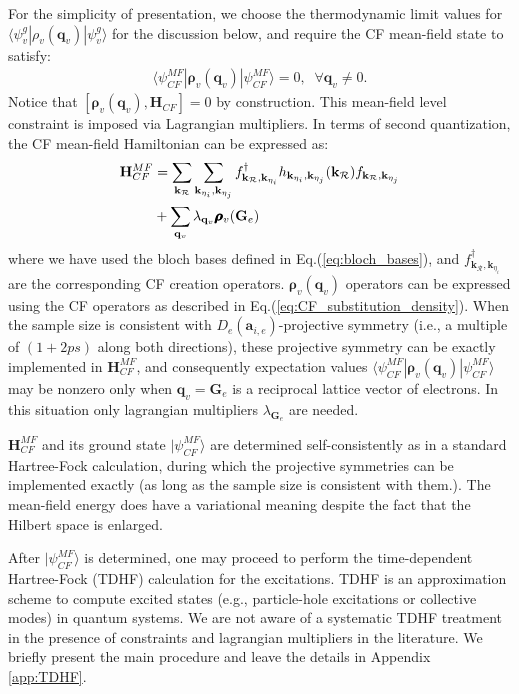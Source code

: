 For the simplicity of presentation, we choose the thermodynamic limit values for $\langle\psi^g_v|\rho_v(\mathbf q_v)|\psi^g_v\rangle$ for the discussion below, and require the CF mean-field state to satisfy:
\begin{align}
\langle \psi^{MF}_{CF}|\pmb{\boldsymbol\rho}_v(\mathbf q_v)|\psi^{MF}_{CF}\rangle=0,\;\; \forall \mathbf q_v\neq 0.\label{eq:mf_constraint_1}
\end{align}
Notice that $[\pmb{\boldsymbol\rho}_v(\mathbf q_v),\mathbf H_{CF}]=0$ by construction. This mean-field level constraint is imposed via Lagrangian multipliers.  In terms of second quantization, the CF mean-field Hamiltonian can be expressed as:
\begin{align}
\mathbf H_{CF}^{MF}&=\sum_{\mathbf k_{\mathcal R}} \sum_{\mathbf k_{\eta_i},\mathbf k_{\eta_j}} f^\dagger_{\mathbf k_{\mathcal R},\mathbf k_{\eta_i}} h_{\mathbf k_{\eta_i},\mathbf k_{\eta_j}}(\mathbf k_{\mathcal R}) f_{\mathbf k_{\mathcal R},\mathbf k_{\eta_j}}\notag\\
&+\sum_{\mathbf q_v}\lambda_{\mathbf q_v}\pmb{\boldsymbol\rho}_v(\mathbf G_e)
\end{align}
where we have used the bloch bases defined in Eq.(\ref{eq:bloch_bases}), and $f^\dagger_{\mathbf k_{\mathcal R},\mathbf k_{\eta_i}}$ are the corresponding CF creation operators. $\pmb{\boldsymbol\rho}_v(\mathbf q_v)$ operators can be expressed using the CF operators as described in Eq.(\ref{eq:CF_substitution_density}). When the sample size is consistent with $D_e(\mathbf a_{i,e})$-projective symmetry (i.e., a multiple of $(1+2ps)$ along both directions), these projective symmetry can be exactly implemented in $\mathbf H_{CF}^{MF}$, and consequently expectation values $\langle \psi^{MF}_{CF}|\pmb{\boldsymbol\rho}_v(\mathbf q_v)|\psi^{MF}_{CF}\rangle$ may be nonzero only when $\mathbf q_v=\mathbf G_e$ is a reciprocal lattice vector of electrons. In this situation only lagrangian multipliers $\lambda_{\mathbf G_e}$ are needed.

$\mathbf H_{CF}^{MF}$ and its ground state $|\psi^{MF}_{CF}\rangle$ are determined self-consistently as in a standard Hartree-Fock calculation, during which the projective symmetries can be implemented exactly (as long as the sample size is consistent with them.). The mean-field energy does have a variational meaning despite the fact that the Hilbert space is enlarged.

After $|\psi^{MF}_{CF}\rangle$ is determined, one may proceed to perform the time-dependent Hartree-Fock (TDHF) calculation for the excitations. TDHF is an approximation scheme to compute excited states (e.g., particle-hole excitations or collective modes) in quantum systems. We are not aware of a systematic TDHF treatment in the presence of constraints and lagrangian multipliers in the literature. We briefly present the main procedure and leave the details in Appendix \ref{app:TDHF}. 

